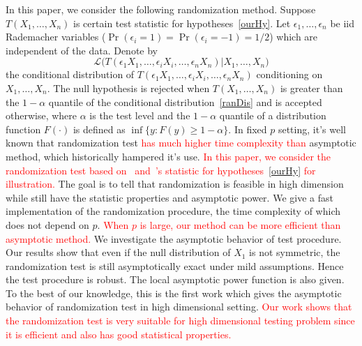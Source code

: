 \documentclass[review]{elsarticle}
\theoremstyle{plain}
\theoremstyle{definition}
\theoremstyle{remark}
\begin{document}
In this paper, we consider the following randomization method.
Suppose $T(X_1,\ldots,X_n)$ is certain test statistic for hypotheses~\eqref{ourHy}.
Let $\epsilon_1,\ldots,\epsilon_n$ be iid Rademacher variables ($\Pr(\epsilon_i=1)=\Pr(\epsilon_i=-1)=1/2$) which are independent of the data.
Denote by
\begin{equation}\label{ranDis}
    \mathcal{L}\big(T(\epsilon_1 X_1,\ldots,\epsilon_i X_i,\ldots,\epsilon_n X_n)|X_1,\ldots,X_n\big)
\end{equation}
 the conditional distribution of $T(\epsilon_1 X_1,\ldots,\epsilon_i X_i,\ldots,\epsilon_n X_n)$ conditioning on $X_1,\ldots,X_n$.
 The null hypothesis is rejected when $T(X_1,\ldots, X_n)$ is greater than the $1-\alpha$ quantile of the conditional distribution~\eqref{ranDis} and is accepted otherwise, where $\alpha$ is the test level and the $1-\alpha$ quantile of a distribution function $F(\cdot)$ is defined as $\inf\{y: F(y)\geq 1-\alpha\}$.
In fixed $p$ setting, it's well known that randomization test \textcolor{red}{has much higher time complexity than} asymptotic method, which  historically  hampered it's use. 
\textcolor{red}{In this paper, we consider the randomization test based on~\cite{Bai1996Efiect} and~\cite{Chen2010A}'s statistic for hypotheses~\eqref{ourHy} for illustration.}
The goal is to tell that randomization is feasible in high dimension while still have the statistic properties and asymptotic power.
We give a fast implementation of the randomization procedure, the time complexity of which does not depend on $p$.
\textcolor{red}{When $p$ is large, our method can be more efficient than asymptotic method.}
We investigate the asymptotic behavior of test procedure.
Our results show that even if the null distribution of $X_1$ is not symmetric, the randomization test is still asymptotically exact under mild assumptions. 
Hence the test procedure is robust.
The local asymptotic power function is also given.
To the best of our knowledge, this is the first work which gives the asymptotic behavior of randomization test in high dimensional setting.
\textcolor{red}{Our work shows that the randomization test is very suitable for high dimensional testing problem since it is \textcolor{red}{efficient} and also has good statistical properties.}






\end{document}
